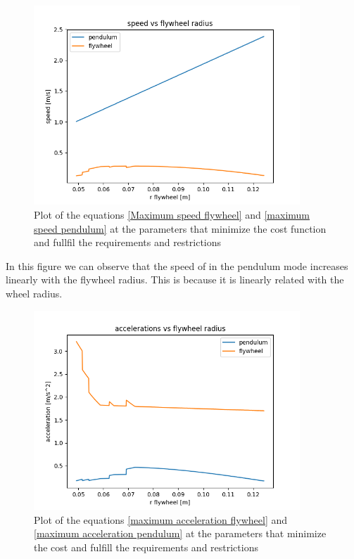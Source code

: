 \begin{figure}[H]
	\centering
	\includegraphics[width=10cm]{img/optimization/speed.png}
	\caption{Plot of the equations \ref{Maximum speed flywheel} and \ref{maximum speed pendulum} at the parameters that minimize the cost function and fullfil the requirements and restrictions}
	\label{fig:Speed plot}
\end{figure}

In this figure we can observe that the speed of in the pendulum mode increases
linearly with the flywheel radius. This is because it is linearly related with
the wheel radius.

\begin{figure}[H]
	\centering
	\includegraphics[width=10cm]{img/optimization/acceleration.png}
	\caption{Plot of the equations \ref{maximum acceleration flywheel} and \ref{maximum acceleration pendulum} at the parameters that minimize the cost and fulfill the requirements and restrictions}
	\label{fig:Speed plot}
\end{figure}

